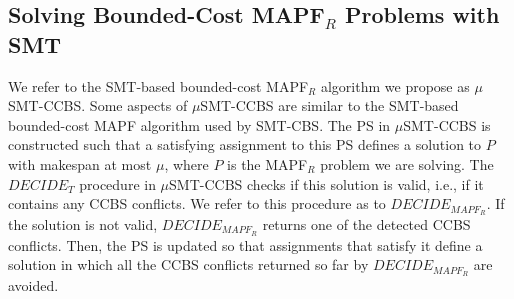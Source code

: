 \documentclass[review]{elsarticle}
\newcommand{\decidet}{\ensuremath{\mathit{DECIDE_T}}\xspace}
\newcommand{\decidemapfr}{\ensuremath{\mathit{DECIDE_{MAPF_R}}}\xspace}
\newcommand\konstantin[1]{\nb{\textbf{Konstantin:}}{red}{#1}}
\newcommand{\smt}{\ac{SMT}\xspace}
\newcommand{\ccbs}{\ac{CCBS}\xspace}
\newcommand{\ps}{\ac{PS}\xspace}
\newcommand{\mapfr}{\ac{MAPF}$_R$\xspace}
\newcommand{\smtcbsO}{SMT-CBS\xspace} %
\newcommand{\smtccbs}{SMT-CCBS\xspace}
\newcommand{\mapf}{\ac{MAPF}\xspace}
\begin{document}



\subsection{Solving Bounded-Cost \mapfr Problems with \smt}
\label{sec:smt-fixed}


We refer to the \smt-based bounded-cost \mapfr algorithm we propose as $\mu$\smtccbs. 
Some aspects of $\mu$\smtccbs are similar to the \smt-based bounded-cost \mapf algorithm used by \smtcbsO. 
The \ps in $\mu$\smtccbs is constructed such that a 
satisfying assignment to this \ps defines a solution to $P$ with makespan at most $\mu$, 
where $P$ is the \mapfr problem we are solving. 
The \decidet procedure in $\mu$\smtccbs checks if this solution is valid, i.e., if it contains any \ccbs conflicts. 
We refer to this procedure as to \decidemapfr .
If the solution is not valid, \decidemapfr returns one of the detected \ccbs conflicts. 
Then, the \ps is updated so that assignments that satisfy it 
define a solution in which all the \ccbs conflicts returned so far by \decidemapfr are avoided. 
\end{document}
